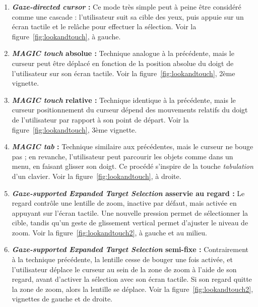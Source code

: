 	\begin{enumerate}
		\item \textbf{\emph{Gaze-directed cursor} :} Ce mode très simple peut à peine être considéré comme une cascade : l'utilisateur suit sa cible des yeux, puis appuie sur un écran tactile et le relâche pour effectuer la sélection. Voir la figure~\ref{fig:lookandtouch}, à gauche.
		\item \textbf{\emph{MAGIC touch} absolue :} Technique analogue à la précédente, mais le curseur peut être déplacé en fonction de la position absolue du doigt de l'utilisateur sur son écran tactile. Voir la figure~\ref{fig:lookandtouch}, 2ème vignette.
		\item \textbf{\emph{MAGIC touch} relative :} Technique identique à la précédente, mais le curseur positionnement du curseur dépend des mouvements relatifs du doigt de l'utilisateur par rapport à son point de départ. Voir la figure~\ref{fig:lookandtouch}, 3ème vignette.
		\item \textbf{\emph{MAGIC tab} :} Technique similaire aux précédentes, mais le curseur ne bouge pas ; en revanche, l'utilisateur peut parcourir les objets comme dans un menu, en faisant glisser son doigt. Ce procédé s'inspire de la touche \emph{tabulation} d'un clavier. Voir la figure~\ref{fig:lookandtouch}, à droite.
		\item \textbf{\emph{Gaze-supported Expanded Target Selection} asservie au regard :} Le regard contrôle une lentille de zoom, inactive par défaut, mais activée en appuyant sur l'écran tactile. Une nouvelle pression permet de sélectionner la cible, tandis qu'un geste de glissement vertical permet d'ajuster le niveau de zoom. Voir la figure~\ref{fig:lookandtouch2}, à gauche et au milieu.
		\item \textbf{\emph{Gaze-supported Expanded Target Selection} semi-fixe :} Contrairement à la technique précédente, la lentille cesse de bouger une fois activée, et l'utilisateur déplace le curseur au sein de la zone de zoom à l'aide de son regard, avant d'activer la sélection avec son écran tactile. Si son regard quitte la zone de zoom, alors la lentille se déplace. Voir la figure~\ref{fig:lookandtouch2}, vignettes de gauche et de droite.
	\end{enumerate}
	
